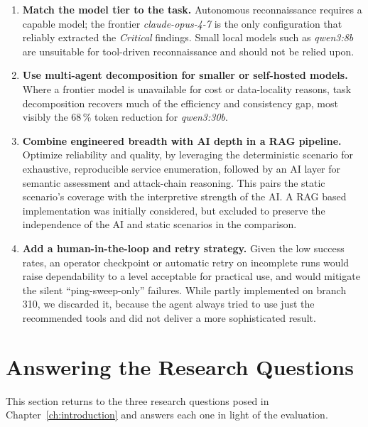 \begin{enumerate}
    \item \textbf{Match the model tier to the task.} Autonomous reconnaissance
    requires a capable model; the frontier \textit{claude-opus-4-7} is the only
    configuration that reliably extracted the \textit{Critical} findings.
    Small local models such as \textit{qwen3:8b} are unsuitable for tool-driven
    reconnaissance and should not be relied upon.

    \item \textbf{Use multi-agent decomposition for smaller or self-hosted models.}
    Where a frontier model is unavailable for cost or data-locality reasons,
    task decomposition recovers much of the efficiency and consistency gap,
    most visibly the 68\,\% token reduction for \textit{qwen3:30b}.

    \item \textbf{Combine engineered breadth with \gls{AI} depth in a \gls{RAG} pipeline.}
    Optimize reliability and quality, by leveraging
    the deterministic scenario for exhaustive, reproducible service
    enumeration, followed by an \gls{AI} layer for semantic assessment and
    attack-chain reasoning.
    This pairs the static scenario's coverage with
    the interpretive strength of the \gls{AI}.
    A \gls{RAG} based implementation was initially considered, but excluded to preserve the
    independence of the \gls{AI} and static scenarios in the comparison.

    \item \textbf{Add a human-in-the-loop and retry strategy.} Given the low success
    rates, an operator checkpoint or automatic retry on incomplete runs would
    raise dependability to a level acceptable for practical use, and would
    mitigate the silent \enquote{ping-sweep-only} failures.
    While partly implemented on branch 310, we discarded it,
    because the agent always tried to use just the recommended tools and did not deliver a more sophisticated result.
\end{enumerate}

\section{Answering the Research Questions}\label{sec:conclusion-to-rq}

This section returns to the three research questions posed in Chapter~\ref{ch:introduction} and answers each one in
light of the evaluation.

